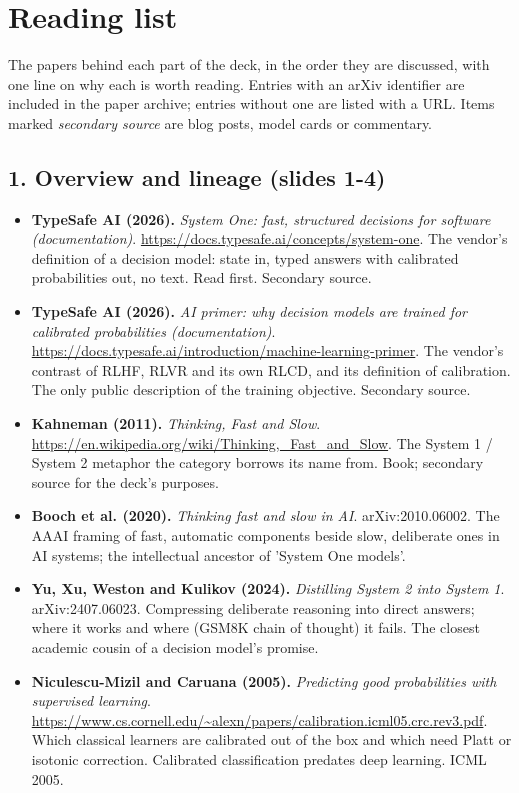 \documentclass[11pt,letterpaper]{article}
\begin{document}
\section{Reading list}
\label{app:reading}
The papers behind each part of the deck, in the order they are discussed, with one line on why each is worth reading. Entries with an arXiv identifier are included in the paper archive; entries without one are listed with a URL. Items marked \emph{secondary source} are blog posts, model cards or commentary.

\subsection*{1. Overview and lineage (slides 1-4)}
\begin{itemize}[leftmargin=1.2em,itemsep=3pt]\sloppy
\item \textbf{TypeSafe AI (2026).} \textit{System One: fast, structured decisions for software (documentation)}. \url{https://docs.typesafe.ai/concepts/system-one}. The vendor's definition of a decision model: state in, typed answers with calibrated probabilities out, no text. Read first. Secondary source.
\item \textbf{TypeSafe AI (2026).} \textit{AI primer: why decision models are trained for calibrated probabilities (documentation)}. \url{https://docs.typesafe.ai/introduction/machine-learning-primer}. The vendor's contrast of RLHF, RLVR and its own RLCD, and its definition of calibration. The only public description of the training objective. Secondary source.
\item \textbf{Kahneman (2011).} \textit{Thinking, Fast and Slow}. \url{https://en.wikipedia.org/wiki/Thinking,_Fast_and_Slow}. The System 1 / System 2 metaphor the category borrows its name from. Book; secondary source for the deck's purposes.
\item \textbf{Booch et al. (2020).} \textit{Thinking fast and slow in AI}. arXiv:2010.06002. The AAAI framing of fast, automatic components beside slow, deliberate ones in AI systems; the intellectual ancestor of 'System One models'.
\item \textbf{Yu, Xu, Weston and Kulikov (2024).} \textit{Distilling System 2 into System 1}. arXiv:2407.06023. Compressing deliberate reasoning into direct answers; where it works and where (GSM8K chain of thought) it fails. The closest academic cousin of a decision model's promise.
\item \textbf{Niculescu-Mizil and Caruana (2005).} \textit{Predicting good probabilities with supervised learning}. \url{https://www.cs.cornell.edu/~alexn/papers/calibration.icml05.crc.rev3.pdf}. Which classical learners are calibrated out of the box and which need Platt or isotonic correction. Calibrated classification predates deep learning. ICML 2005.

\end{itemize}
\end{document}
